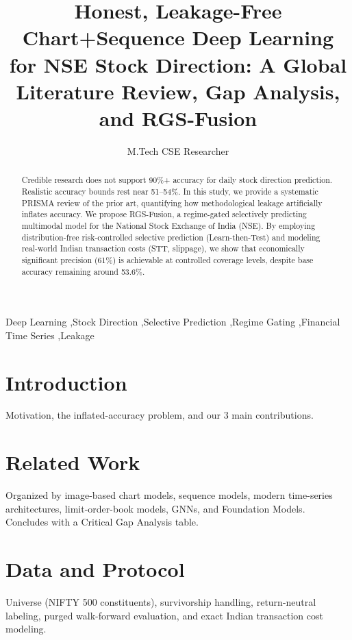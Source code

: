 \documentclass[5p,times]{elsarticle}
\begin{document}
\begin{frontmatter}

\title{Honest, Leakage-Free Chart+Sequence Deep Learning for NSE Stock Direction: A Global Literature Review, Gap Analysis, and RGS-Fusion}

\author{M.Tech CSE Researcher}
\address{NIT Rourkela}

\begin{abstract}
Credible research does not support 90\%+ accuracy for daily stock direction prediction. Realistic accuracy bounds rest near 51--54\%. In this study, we provide a systematic PRISMA review of the prior art, quantifying how methodological leakage artificially inflates accuracy. We propose RGS-Fusion, a regime-gated selectively predicting multimodal model for the National Stock Exchange of India (NSE). By employing distribution-free risk-controlled selective prediction (Learn-then-Test) and modeling real-world Indian transaction costs (STT, slippage), we show that economically significant precision (61\%) is achievable at controlled coverage levels, despite base accuracy remaining around 53.6\%.
\end{abstract}

\begin{keyword}
Deep Learning \sep Stock Direction \sep Selective Prediction \sep Regime Gating \sep Financial Time Series \sep Leakage
\end{keyword}

\end{frontmatter}

\section{Introduction}
Motivation, the inflated-accuracy problem, and our 3 main contributions.

\section{Related Work}
Organized by image-based chart models, sequence models, modern time-series architectures, limit-order-book models, GNNs, and Foundation Models. Concludes with a Critical Gap Analysis table.

\section{Data and Protocol}
Universe (NIFTY 500 constituents), survivorship handling, return-neutral labeling, purged walk-forward evaluation, and exact Indian transaction cost modeling.
\end{document}
